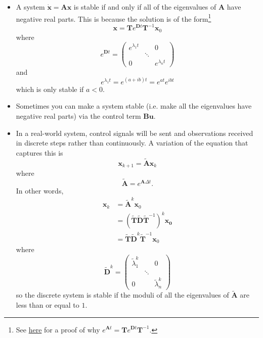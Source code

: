 \documentclass{article}
\renewcommand{\vec}[1]{\boldsymbol{\mathbf{#1}}}
\newcommand{\dvec}[1]{\dot{\vec{#1}}}
\begin{document}
\begin{itemize}
  \item A system $\dvec{x} = \vec{A} \vec{x}$ is stable if and only if all of the eigenvalues of $\vec{A}$ have negative real parts. This is because the solution is of the form\footnote{See \href{https://www.youtube.com/watch?v=nyqJJdhReiA\#t=15m15s}{here} for a proof of why $e^{\vec{A} t} = \vec{T} e^{\vec{D} t} \vec{T}^{-1}$.} \[\vec{x} = \vec{T} e^{\vec{D} t} \vec{T}^{-1} \vec{x}_0\] where \[e^{\vec{D} t} = \begin{pmatrix}
            e^{\lambda_1 t} &        & 0               \\
                            & \ddots &                 \\
            0               &        & e^{\lambda_n t}
          \end{pmatrix}\] and \[e^{\lambda_1 t} = e^{(a + i b) t} = e^{a t} e^{i b t}\] which is only stable if $a < 0$.

  \item Sometimes you can make a system stable (i.e. make all the eigenvalues have negative real parts) via the control term $\vec{B} \vec{u}$.

  \item In a real-world system, control signals will be sent and observations received in discrete steps rather than continuously. A variation of the equation that captures this is \[\vec{x}_{k + 1} = \tilde{\vec{A}} \vec{x}_k\] where \[\tilde{\vec{A}} = e^{\vec{A} \Delta t}.\] In other words, \begin{align*}
          \vec{x}_k & = \tilde{\vec{A}}^k \vec{x}_0                                        \\
                    & = (\tilde{\vec{T}} \tilde{\vec{D}} \tilde{\vec{T}}^{-1})^k \vec{x_0} \\
                    & = \tilde{\vec{T}} \tilde{\vec{D}}^k \tilde{\vec{T}}^{-1} \vec{x}_0
        \end{align*} where \[\tilde{\vec{D}}^k = \begin{pmatrix}
            \tilde{\lambda}_1^k &        & 0                   \\
                                & \ddots &                     \\
            0                   &        & \tilde{\lambda}_n^k
          \end{pmatrix}\] so the discrete system is stable if the moduli of all the eigenvalues of $\tilde{\vec{A}}$ are less than or equal to $1$.


\end{itemize}
\end{document}
